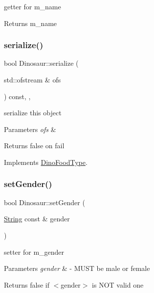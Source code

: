 getter for m\+\_\+name \begin{DoxyReturn}{Returns}
m\+\_\+name 
\end{DoxyReturn}
\mbox{\label{classDinosaur_a9dc25dc1d834210d869641893695de22}} 
\subsubsection{\texorpdfstring{serialize()}{serialize()}}
{\footnotesize\ttfamily bool Dinosaur\+::serialize (\begin{DoxyParamCaption}\item[{std\+::ofstream \&}]{ofs }\end{DoxyParamCaption}) const\hspace{0.3cm}{\ttfamily [final]}, {\ttfamily [override]}, {\ttfamily [virtual]}}

serialize this object 
\begin{DoxyParams}{Parameters}
{\em ofs} & \\
\hline
\end{DoxyParams}
\begin{DoxyReturn}{Returns}
false on fail 
\end{DoxyReturn}


Implements \hyperlink{classDinoFoodType_a3654985e0619a24a19bda8280557651e}{Dino\+Food\+Type}.

\mbox{\label{classDinosaur_a7fa4a358709db5379e21065b050a6e1c}} 
\subsubsection{\texorpdfstring{set\+Gender()}{setGender()}}
{\footnotesize\ttfamily bool Dinosaur\+::set\+Gender (\begin{DoxyParamCaption}\item[{\hyperlink{classString}{String} const \&}]{gender }\end{DoxyParamCaption})}

setter for m\+\_\+gender 
\begin{DoxyParams}{Parameters}
{\em gender} & -\/ M\+U\+ST be \textquotesingle{}male\textquotesingle{} or \textquotesingle{}female\textquotesingle{} \\
\hline
\end{DoxyParams}
\begin{DoxyReturn}{Returns}
false if $<$gender$>$ is N\+OT valid one 
\end{DoxyReturn}
\mbox{\label{classDinosaur_a2f7fcf6777178a077176140f9ce024c5}} 
